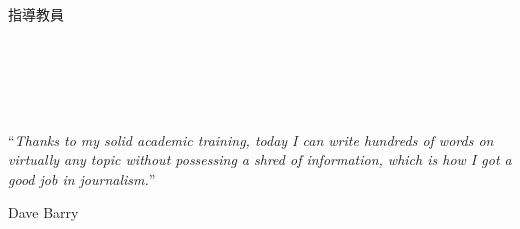 \documentclass[
  letterpaper,
  11pt,
  english,
  singlespacing,
  headsepline,
  japanese,
  oneside]{MastersDoctoralThesis}
\begin{document}
\begin{titlepage}
\begin{center}
\textit{}\\[2.0cm]
\LARGE 指導教員　\supname\\[0.5cm] %
 
\vfill

\textit{}\\[0.5cm]
\LARGE\deptname\\
\LARGE\groupname\\[0.3cm] %
\LARGE\authorname\\[0cm]  %

\vfill




 
\vfill
\end{center}
\end{titlepage}

\begin{declaration}
\addchaptertocentry{\authorshipname} %


\end{declaration}

\cleardoublepage


\vspace*{0.2\textheight}

\noindent``{\itshape Thanks to my solid academic training, today I can
write hundreds of words on virtually any topic without possessing a
shred of information, which is how I got a good job in
journalism.}''\bigbreak

\hfill Dave Barry


\end{document}
